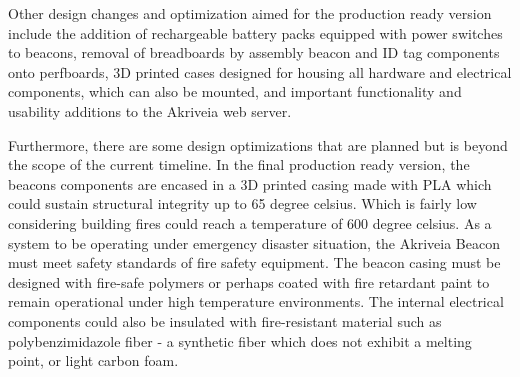 \bigskip
Other design changes and optimization aimed for the production ready version include the addition of rechargeable battery packs equipped with power switches to beacons, removal of breadboards by assembly beacon and ID tag components onto perfboards, 3D printed cases designed for housing all hardware and electrical components, which can also be mounted, and important functionality and usability additions to the Akriveia web server.

\bigskip
Furthermore, there are some design optimizations that are planned but is beyond the scope of the current timeline. In the final production ready version, the beacons components are encased in a 3D printed casing made with PLA which could sustain structural integrity up to 65 degree celsius. Which is fairly low considering building fires could reach a temperature of 600 degree celsius. As a system to be operating under emergency disaster situation, the Akriveia Beacon must meet safety standards of fire safety equipment. The beacon casing must be designed with fire-safe polymers or perhaps coated with fire retardant paint to remain operational under high temperature environments. The internal electrical components could also be insulated with fire-resistant material such as polybenzimidazole fiber - a synthetic fiber which does not exhibit a melting point, or light carbon foam.
